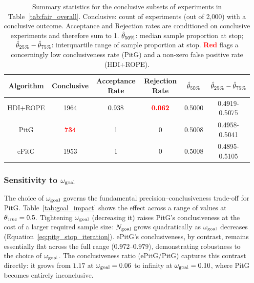 \begin{table}[h!]
  \begin{center}
  \begin{tabular}{c|c|c|c|c|c}
    \hline
    Algorithm & Conclusive & Acceptance Rate & Rejection Rate &  $\hat{\theta}_{\rm 50\%}$ & $\hat{\theta}_{\rm 25\%} - \hat{\theta}_{\rm 75\%}$\\
    \hline
    HDI+ROPE & 1964 & 0.938 & \textcolor{red}{\textbf{0.062}} & 0.5000 & 0.4919-0.5075 \\
    PitG     &  \textcolor{red}{\textbf{734}} & 1     & 0     & 0.5008 & 0.4958-0.5041 \\
    ePitG    & 1953 & 1     & 0     & 0.5008 & 0.4895-0.5105\\
    \hline
  \end{tabular}
  \caption{Summary statistics for the conclusive subsets of experiments in
  Table~\ref{tab:fair_overall}.
  Conclusive: count of experiments (out of 2{,}000) with a conclusive outcome.
  Acceptance and Rejection rates are conditioned on conclusive experiments
  and therefore sum to 1.
  $\hat{\theta}_{\rm 50\%}$: median sample proportion at stop;
  $\hat{\theta}_{\rm 25\%} - \hat{\theta}_{\rm 75\%}$: interquartile range of
  sample proportion at stop.
  \textcolor{red}{\textbf{Red}} flags a
  concerningly low conclusiveness rate (PitG) and a non-zero false positive rate (HDI+ROPE).}
  \label{tab:fair_conclusive}
\end{center}
\end{table}

\subsubsection{Sensitivity to $\omega_{\rm goal}$}\label{sec:goal_impact}

The choice of $\omega_{\rm goal}$ governs the fundamental precision--conclusiveness
trade-off for PitG. Table~\ref{tab:goal_impact} shows the effect across a range of values
at $\theta_{\rm true}=0.5$. Tightening $\omega_{\rm goal}$ (decreasing it) raises PitG's
conclusiveness at the cost of a larger required sample size: $N_{\rm goal}$ grows
quadratically as $\omega_{\rm goal}$ decreases (Equation~\ref{eq:pitg_stop_iteration}).
ePitG's conclusiveness, by contrast, remains essentially flat across the full range
($0.972$--$0.979$), demonstrating robustness to the choice of $\omega_{\rm goal}$.
The conclusiveness ratio (ePitG/PitG) captures this contrast directly: it grows from
$1.17$ at $\omega_{\rm goal}=0.06$ to infinity at $\omega_{\rm goal}=0.10$, where PitG
becomes entirely inconclusive.

